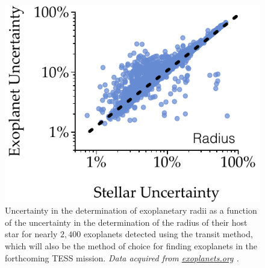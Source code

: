 \begin{figure}
    \centering
    \begin{minipage}[c]{0.5\textwidth}%
        \includegraphics[width=\textwidth]{figs/exo-radius.pdf}%
    \end{minipage}%
    \hfill
    \begin{minipage}[c]{0.45\textwidth}
        \caption[Exoplanetary uncertainty vs.~host star uncertainty]{Uncertainty in the determination of exoplanetary radii as a function of the uncertainty in the determination of the radius of their host star for nearly $2,400$ exoplanets detected using the transit method, which will also be the method of choice for finding exoplanets in the forthcoming TESS mission. 
        \emph{Data acquired from \href{http://exoplanets.org}{exoplanets.org} \citep{2014PASP..126..827H}.}
        \label{fig:exoplanets}}
    \end{minipage}
\end{figure}

